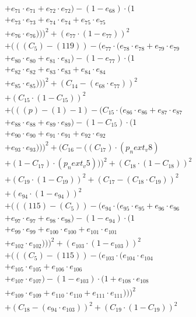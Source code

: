 \documentclass[10pt, a4paper]{article}
\begin{document}
\begin{small}
\begin{align*}
& + e_{71} \cdot e_{71} + e_{72} \cdot e_{72}) - (1 - e_{68}) \cdot (1 \\
& + e_{73} \cdot e_{73} + e_{74} \cdot e_{74} + e_{75} \cdot e_{75} \\
& + e_{76} \cdot e_{76})))^{2} + (e_{77} \cdot (1 - e_{77}))^{2} \\
& + (((C_{5}) - (119)) - (e_{77} \cdot (e_{78} \cdot e_{78} + e_{79} \cdot e_{79} \\
& + e_{80} \cdot e_{80} + e_{81} \cdot e_{81}) - (1 - e_{77}) \cdot (1 \\
& + e_{82} \cdot e_{82} + e_{83} \cdot e_{83} + e_{84} \cdot e_{84} \\
& + e_{85} \cdot e_{85})))^{2} + (C_{14} - (e_{68} \cdot e_{77}))^{2} \\
& + (C_{15} \cdot (1 - C_{15}))^{2} \\
& + (((p) - (1) - 1) - (C_{15} \cdot (e_{86} \cdot e_{86} + e_{87} \cdot e_{87} \\
& + e_{88} \cdot e_{88} + e_{89} \cdot e_{89}) - (1 - C_{15}) \cdot (1 \\
& + e_{90} \cdot e_{90} + e_{91} \cdot e_{91} + e_{92} \cdot e_{92} \\
& + e_{93} \cdot e_{93})))^{2} + (C_{16} - ((C_{17})  \cdot  (p_next_v8) \\
& + (1 - C_{17})  \cdot  (p_next_v5)))^{2} + (C_{18} \cdot (1 - C_{18}))^{2} \\
& + (C_{19} \cdot (1 - C_{19}))^{2} + (C_{17} - (C_{18} \cdot C_{19}))^{2} \\
& + (e_{94} \cdot (1 - e_{94}))^{2} \\
& + (((115) - (C_{5})) - (e_{94} \cdot (e_{95} \cdot e_{95} + e_{96} \cdot e_{96} \\
& + e_{97} \cdot e_{97} + e_{98} \cdot e_{98}) - (1 - e_{94}) \cdot (1 \\
& + e_{99} \cdot e_{99} + e_{100} \cdot e_{100} + e_{101} \cdot e_{101} \\
& + e_{102} \cdot e_{102})))^{2} + (e_{103} \cdot (1 - e_{103}))^{2} \\
& + (((C_{5}) - (115)) - (e_{103} \cdot (e_{104} \cdot e_{104} \\
& + e_{105} \cdot e_{105} + e_{106} \cdot e_{106} \\
& + e_{107} \cdot e_{107}) - (1 - e_{103}) \cdot (1 + e_{108} \cdot e_{108} \\
& + e_{109} \cdot e_{109} + e_{110} \cdot e_{110} + e_{111} \cdot e_{111})))^{2} \\
& + (C_{18} - (e_{94} \cdot e_{103}))^{2} + (C_{19} \cdot (1 - C_{19}))^{2} \\

\end{align*}
\end{small}
\end{document}
